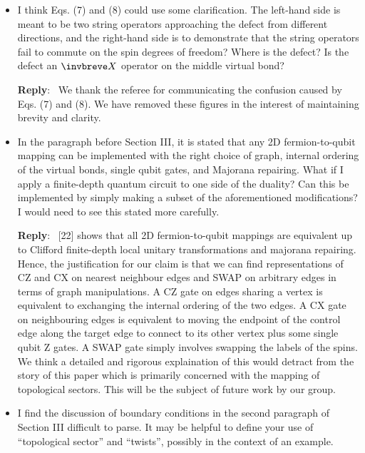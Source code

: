 \documentclass[aps,prx,floatfix,10pt,amssymb,amsfont,amsmath,superscriptaddress,float,nofootinbib,longbibliography,nobalancelastpage]{revtex4-2}
\newenvironment{reply}
   {\medskip \noindent \begin{sf}\textbf{Reply}:\ \color{blue}  }
   {\medskip \end{sf}}
\begin{document}
\begin{itemize}
\begin{reply}
    On a torus this consideration becomes more important as there are now two ways to translate past the defect which led to two different twists. 
\end{reply}

\item I think Eqs. (7) and (8) could use some clarification. The left-hand side is meant to be two string operators approaching the defect from different directions, and the right-hand side is to demonstrate that the string operators fail to commute on the spin degrees of freedom? Where is the defect? Is the defect an $\invbreve X$ operator on the middle virtual bond?

\begin{reply}
    We thank the referee for communicating the confusion caused by Eqs. (7) and (8). We have removed these figures in the interest of maintaining brevity and clarity.
\end{reply}

\item In the paragraph before Section III, it is stated that any 2D fermion-to-qubit mapping can be implemented with the right choice of graph, internal ordering of the virtual bonds, single qubit gates, and Majorana repairing. What if I apply a finite-depth quantum circuit to one side of the duality? Can this be implemented by simply making a subset of the aforementioned modifications? I would need to see this stated more carefully.

\begin{reply}
    [22] shows that all 2D fermion-to-qubit mappings are equivalent up to Clifford finite-depth local unitary transformations and majorana repairing. Hence, the justification for our claim is that we can find representations of CZ and CX on nearest neighbour edges and SWAP on arbitrary edges in terms of graph manipulations. A CZ gate on edges sharing a vertex is equivalent to exchanging the internal ordering of the two edges. A CX gate on neighbouring edges is equivalent to moving the endpoint of the control edge along the target edge to connect to its other vertex plus some single qubit Z gates. A SWAP gate simply involves swapping the labels of the spins. We think a detailed and rigorous explaination of this would detract from the story of this paper which is primarily concerned with the mapping of topological sectors. This will be the subject of future work by our group.
\end{reply}

\item I find the discussion of boundary conditions in the second paragraph of Section III difficult to parse. It may be helpful to define your use of “topological sector” and “twists”, possibly in the context of an example.


\end{itemize}
\end{document}
